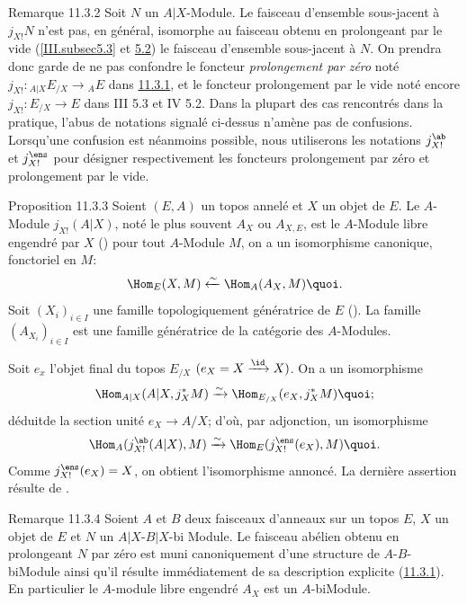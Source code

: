 \begin{enonce*}[remark]{Remarque 11.3.2}
Soit $N$ un $A| X$-Module. Le faisceau d'ensemble sous-jacent à
$j_{X!}N$ n'est pas, en général, isomorphe au faisceau obtenu en
prolongeant par le vide (\ref{III.subsec5.3} et \hyperref[IV.subsec5.2]{5.2}) le faisceau
d'ensemble sous-jacent à $N$. On prendra donc garde de ne pas
confondre le foncteur \emph{prolongement par zéro} noté
$j_{X!}:{}_{A|X}E_{/X}\rightarrow {}_{A}E$ dans \hyperref[IV.prop11.3.1]{11.3.1},
et le foncteur prolongement par le vide noté encore
$j_{X!}:E_{/X}\rightarrow E$ dans III 5.3 et IV 5.2. Dans la plupart
des cas rencontrés dans la pratique, l'abus de notations signalé
ci-dessus n'amène pas de confusions. Lorsqu'une confusion est
néanmoins possible, nous utiliserons les notations $j^{\ab}_{X!}$ et
$j^{\ens}_{X!}$ pour désigner respectivement les foncteurs
prolongement par zéro et prolongement par le vide.
\end{enonce*}

\begin{enonce*}{Proposition 11.3.3}
Soient $(E,A)$ un topos annelé et $X$ un objet de $E$. Le $A$-Module
$j_{X!}(A| X)$, noté le plus souvent $A_X$ ou $A_{X,E}$, est le
$A$-Module libre engendré par $X$ {\rm ()} \ie pour
tout $A$-Module $M$, on a un isomorphisme canonique, fonctoriel en
$M$:
$$
\Hom_E(X,M)\xleftarrow{\sim} \Hom_A (A_X, M){\quoi}.
$$
Soit $(X_i)_{i\in I}$ une famille topologiquement génératrice de $E$
{\rm ().} La famille $(A_{X_i})_{i\in I}$ est une
famille génératrice de la catégorie des $A$-Modules.
\end{enonce*}

Soit $e_x$ l'objet final du topos $E_{/X}$
$(e_X=X\xrightarrow{\id}X)$. On a un isomorphisme
$$
\Hom_{A| X}(A| X, j^{\ast}_X M)\xrightarrow{\sim} \Hom_{E_{/X}}(e_X,
j^{\ast}_X M){\quoi};
$$
déduit\pageoriginale de la section unité $e_X\rightarrow A/X$; d'où,
par adjonction, un isomorphisme
$$
\Hom_A(j^{\ab}_{X!}(A| X),
M)\xrightarrow{\sim}\Hom_E(j^{\ens}_{X!}(e_X),M){\quoi}.
$$
Comme $j^{\ens}_{X!}(e_X)=X$, on obtient l'isomorphisme annoncé. La
dernière assertion résulte de .

\begin{enonce*}[remark]{Remarque 11.3.4}
Soient $A$ et $B$ deux faisceaux d'anneaux sur un topos $E$, $X$ un
objet de $E$ et $N$ un $A|X$-$B| X$-bi Module. Le faisceau abélien
obtenu en prolongeant $N$ par zéro est muni canoniquement d'une
structure de $A$-$B$-biModule ainsi qu'il résulte immédiatement de
sa description explicite (\hyperref[IV.prop11.3.1]{11.3.1}). En particulier le
$A$-module libre engendré $A_X$ est un $A$-biModule.
\end{enonce*}

